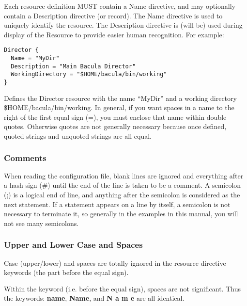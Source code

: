 Each resource definition MUST contain a Name directive, and may optionally
contain a Description directive (or record). The Name directive is used to
uniquely identify the resource. The Description directive is (will be) used
during display of the Resource to provide easier human recognition. For
example: 

\footnotesize
\begin{verbatim}
Director {
  Name = "MyDir"
  Description = "Main Bacula Director"
  WorkingDirectory = "$HOME/bacula/bin/working"
}
\end{verbatim}
\normalsize

Defines the Director resource with the name ``MyDir'' and a working directory
\$HOME/bacula/bin/working. In general, if you want spaces in a name to the
right of the first equal sign (=), you must enclose that name within double
quotes. Otherwise quotes are not generally necessary because once defined,
quoted strings and unquoted strings are all equal. 
\label{Comments}

\subsubsection*{Comments}

When reading the configuration file, blank lines are ignored and everything
after a hash sign (\#) until the end of the line is taken to be a comment. A
semicolon (;) is a logical end of line, and anything after the semicolon is
considered as the next statement. If a statement appears on a line by itself,
a semicolon is not necessary to terminate it, so generally in the examples in
this manual, you will not see many semicolons. 
\label{Case1}

\subsubsection*{Upper and Lower Case and Spaces}

Case (upper/lower) and spaces are totally ignored in the resource directive
keywords (the part before the equal sign). 

Within the keyword (i.e. before the equal sign), spaces are not significant.
Thus the keywords: {\bf name}, {\bf Name}, and {\bf N a m e} are all
identical. 


